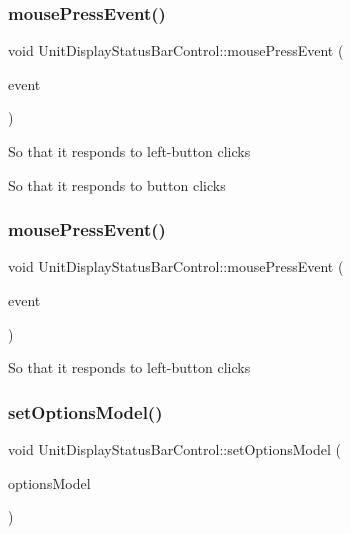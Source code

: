 \subsubsection{\texorpdfstring{mousePressEvent()}{mousePressEvent()}\hspace{0.1cm}{\footnotesize\ttfamily [1/2]}}
{\footnotesize\ttfamily void Unit\+Display\+Status\+Bar\+Control\+::mouse\+Press\+Event (\begin{DoxyParamCaption}\item[{Q\+Mouse\+Event $\ast$}]{event }\end{DoxyParamCaption})\hspace{0.3cm}{\ttfamily [protected]}}

So that it responds to left-\/button clicks

So that it responds to button clicks \mbox{\label{class_unit_display_status_bar_control_a645cb0f2a435881ca9cc5ac09355cff0}} 
\subsubsection{\texorpdfstring{mousePressEvent()}{mousePressEvent()}\hspace{0.1cm}{\footnotesize\ttfamily [2/2]}}
{\footnotesize\ttfamily void Unit\+Display\+Status\+Bar\+Control\+::mouse\+Press\+Event (\begin{DoxyParamCaption}\item[{Q\+Mouse\+Event $\ast$}]{event }\end{DoxyParamCaption})\hspace{0.3cm}{\ttfamily [protected]}}

So that it responds to left-\/button clicks \mbox{\label{class_unit_display_status_bar_control_ac8d2a43f66f3f71c7d6926dbd5927066}} 
\subsubsection{\texorpdfstring{setOptionsModel()}{setOptionsModel()}\hspace{0.1cm}{\footnotesize\ttfamily [1/2]}}
{\footnotesize\ttfamily void Unit\+Display\+Status\+Bar\+Control\+::set\+Options\+Model (\begin{DoxyParamCaption}\item[{\mbox{\hyperlink{class_options_model}{Options\+Model}} $\ast$}]{options\+Model }\end{DoxyParamCaption})}

